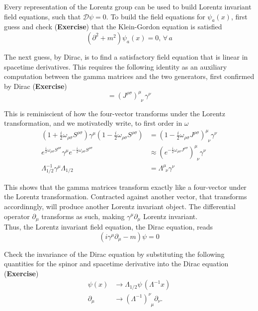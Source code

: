 \noindent Every representation of the Lorentz group can be used to build Lorentz invariant field equations, such that $\mathcal{D}\psi=0$. To build the field equations for $\psi_a(x)$, first guess and check (\textbf{Exercise}) that the Klein-Gordon equation is satisfied
\begin{equation}
(\partial^2 + m^2) \psi_a(x) = 0, \, \forall \, a
\end{equation}

\noindent The next guess, by Dirac, is to find a satisfactory field equation that is linear in spacetime derivatives. This requires the following identity as an auxiliary computation between the gamma matrices and the two generators, first confirmed by Dirac (\textbf{Exercise})
\begin{equation}
[\gamma^\mu, S^{\rho\sigma}] = (J^{\rho\sigma})^\mu_{\,\,\,\nu} \, \gamma^\nu
\end{equation}

\noindent This is reminiscient of how the four-vector transforms under the Lorentz transformation, and we motivatedly write, to first order in $\omega$
\begin{align}
(1+\frac{i}{2}  \omega_{\rho\sigma} S^{\rho\sigma}) \gamma^\mu (1-\frac{i}{2}  \omega_{\rho\sigma} S^{\rho\sigma}) &= (1-\frac{i}{2}  \omega_{\rho\sigma} J^{\rho\sigma})^\mu_{\,\,\,\nu} \gamma^\nu \\
e^{\frac{i}{2} \omega_{\rho\sigma} S^{\rho\sigma}} \gamma^\mu e^{-\frac{i}{2} \omega_{\rho\sigma} S^{\rho\sigma}} &\approx (e^{-\frac{i}{2} \omega_{\rho\sigma} J^{\rho\sigma}})^\mu_{\,\,\,\nu} \gamma^\nu  \\
\Lambda_{1/2}^{-1} \gamma^\mu \Lambda_{1/2} &= \Lambda^\mu_{\,\,\,\nu} \gamma^\nu
\end{align}

\noindent This shows that the gamma matrices transform exactly like a four-vector under the Lorentz transformation. Contracted against another vector, that transforms accordinngly, will produce another Lorentz invariant object. The differential operator $\partial_\mu$ transforms as such, making $\gamma^\mu \partial_\mu$ Lorentz invariant. \\

\noindent Thus, the Lorentz invariant field equation, the Dirac equation, reads
\begin{equation}
(i\gamma^\mu \partial_\mu - m) \psi = 0
\end{equation}

\noindent Check the invariance of the Dirac equation by substituting the following quantities for the spinor and spacetime derivative into the Dirac equation (\textbf{Exercise})
\begin{align}
\psi(x) &\to \Lambda_{1/2} \psi \, (\Lambda^{-1}x) \\
\partial_\mu &\to (\Lambda^{-1})^\nu_{\,\,\,\mu} \partial_\nu .
\end{align}

